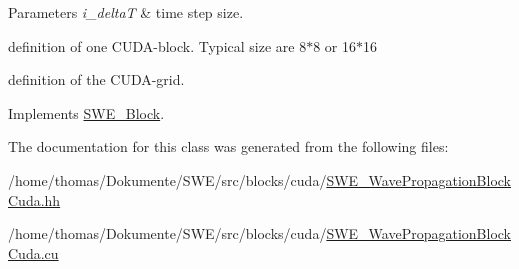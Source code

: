 \begin{DoxyParams}{Parameters}
{\em i\-\_\-delta\-T} & time step size. \\
\hline
\end{DoxyParams}
definition of one C\-U\-D\-A-\/block. Typical size are 8$\ast$8 or 16$\ast$16

definition of the C\-U\-D\-A-\/grid. 

Implements \hyperlink{classSWE__Block_ab2b4b659f23d5d45413dece8d2da3298}{S\-W\-E\-\_\-\-Block}.



The documentation for this class was generated from the following files\-:\begin{DoxyCompactItemize}
\item 
/home/thomas/\-Dokumente/\-S\-W\-E/src/blocks/cuda/\hyperlink{SWE__WavePropagationBlockCuda_8hh}{S\-W\-E\-\_\-\-Wave\-Propagation\-Block\-Cuda.\-hh}\item 
/home/thomas/\-Dokumente/\-S\-W\-E/src/blocks/cuda/\hyperlink{SWE__WavePropagationBlockCuda_8cu}{S\-W\-E\-\_\-\-Wave\-Propagation\-Block\-Cuda.\-cu}\end{DoxyCompactItemize}

